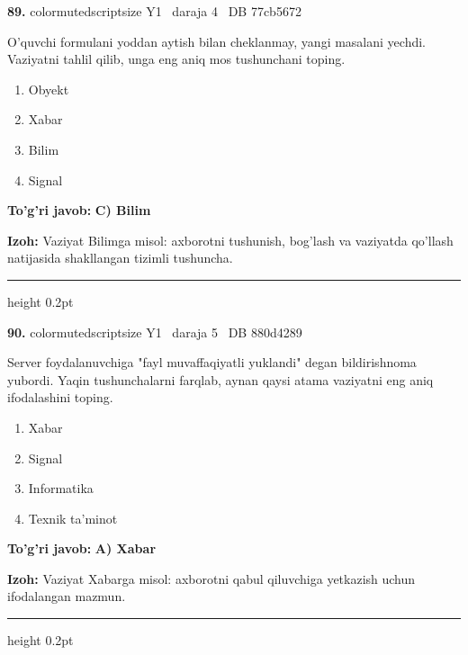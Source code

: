 \documentclass[10pt,a4paper,oneside]{article}
\begin{document}
\noindent\textbf{\color{ink}89.}  {color{muted}scriptsize Y1 \textbullet\ daraja 4 \textbullet\ DB 77cb5672}
\par
O'quvchi formulani yoddan aytish bilan cheklanmay, yangi masalani yechdi. Vaziyatni tahlil qilib, unga eng aniq mos tushunchani toping.
\begin{enumerate}[label=\Alph*),leftmargin=9mm]
\item Obyekt
\item Xabar
\item Bilim
\item Signal
\end{enumerate}
\begin{tcolorbox}[enhanced,breakable,colback=teal!4,colframe=teal!50!black,boxrule=0.5pt,arc=1.1mm,left=3mm,right=3mm,top=1.7mm,bottom=1.7mm,before skip=2mm,after skip=2mm]
\textbf{\color{teal}To'g'ri javob:} \textbf{C) Bilim}
\par\smallskip
\textbf{Izoh:} Vaziyat Bilimga misol: axborotni tushunish, bog'lash va vaziyatda qo'llash natijasida shakllangan tizimli tushuncha.
\end{tcolorbox}
\vspace{2mm}\hrule height 0.2pt \vspace{3mm}

\noindent\textbf{\color{ink}90.}  {color{muted}scriptsize Y1 \textbullet\ daraja 5 \textbullet\ DB 880d4289}
\par
Server foydalanuvchiga "fayl muvaffaqiyatli yuklandi" degan bildirishnoma yubordi. Yaqin tushunchalarni farqlab, aynan qaysi atama vaziyatni eng aniq ifodalashini toping.
\begin{enumerate}[label=\Alph*),leftmargin=9mm]
\item Xabar
\item Signal
\item Informatika
\item Texnik ta'minot
\end{enumerate}
\begin{tcolorbox}[enhanced,breakable,colback=teal!4,colframe=teal!50!black,boxrule=0.5pt,arc=1.1mm,left=3mm,right=3mm,top=1.7mm,bottom=1.7mm,before skip=2mm,after skip=2mm]
\textbf{\color{teal}To'g'ri javob:} \textbf{A) Xabar}
\par\smallskip
\textbf{Izoh:} Vaziyat Xabarga misol: axborotni qabul qiluvchiga yetkazish uchun ifodalangan mazmun.
\end{tcolorbox}
\vspace{2mm}\hrule height 0.2pt \vspace{3mm}
\end{document}
